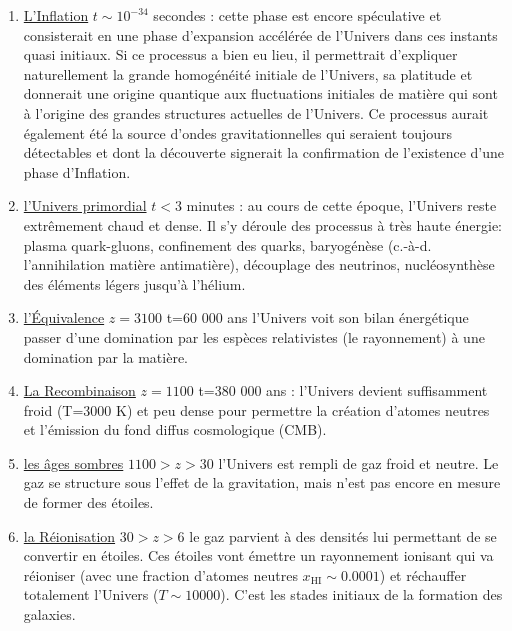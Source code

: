 \begin{enumerate}
\item \underline{L'Inflation} $t\sim 10^{-34}$ secondes :  cette phase est encore spéculative et consisterait en une phase d'expansion accélérée de l'Univers dans ces instants quasi initiaux. Si ce processus a bien eu lieu, il permettrait d'expliquer naturellement la grande homogénéité initiale de l'Univers, sa platitude et donnerait une origine quantique aux fluctuations initiales de matière qui sont à l'origine des grandes structures actuelles de l'Univers. Ce processus aurait également été la source d'ondes gravitationnelles qui seraient toujours détectables et dont la découverte signerait la confirmation de l'existence d'une phase d'Inflation.
\item \underline{l'Univers primordial} $t<3$ minutes : au cours de cette époque, l'Univers reste extrêmement chaud et dense. Il s'y déroule des processus à très haute énergie: plasma quark-gluons, confinement des quarks, baryogénèse (c.-à-d. l'annihilation matière antimatière), découplage des neutrinos, nucléosynthèse des éléments légers jusqu'à l'hélium.
\item \underline{l'Équivalence} $z=3100$ t=60 000 ans  l'Univers voit son bilan énergétique passer d'une domination par les espèces relativistes (le rayonnement) à une domination par la matière.
\item \underline{La Recombinaison} $z=1100$ t=380 000 ans : l'Univers devient suffisamment froid (T=3000 K) et peu dense pour permettre la création d'atomes neutres et l'émission du fond diffus cosmologique (CMB). 
\item \underline{les âges sombres} $1100>z>30$  l'Univers est rempli de gaz froid et neutre. Le gaz se structure sous l'effet de la gravitation, mais  n'est pas encore en mesure de former des étoiles. 
\item \underline{la Réionisation} $30>z>6$ le gaz parvient à des densités lui permettant de se convertir en étoiles. Ces étoiles vont émettre un rayonnement ionisant qui va réioniser (avec une fraction d'atomes neutres $x_\mathrm{HI}\sim0.0001$) et réchauffer totalement l'Univers ($T\sim 10000$). C'est les stades initiaux de la formation des galaxies.

\end{enumerate}
